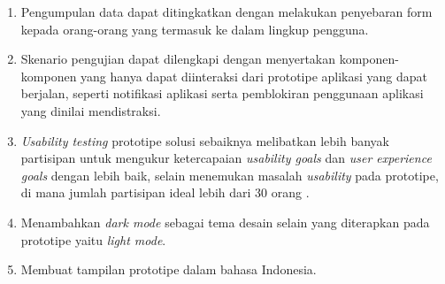 \begin{enumerate}
  \item Pengumpulan data dapat ditingkatkan dengan melakukan penyebaran form kepada orang-orang yang termasuk ke dalam lingkup pengguna.
  
  
  \item Skenario pengujian dapat dilengkapi dengan menyertakan komponen-komponen yang hanya dapat diinteraksi dari prototipe aplikasi yang dapat berjalan, seperti notifikasi aplikasi serta pemblokiran penggunaan aplikasi yang dinilai mendistraksi.
  
  \item \textit{Usability testing} prototipe solusi sebaiknya melibatkan lebih banyak partisipan untuk mengukur ketercapaian \textit{usability goals} dan \textit{user experience goals} dengan lebih baik, selain menemukan masalah \textit{usability} pada prototipe, di mana jumlah partisipan ideal lebih dari 30 orang \parencite{nielsenminimaltest}. 
  
  \item Menambahkan \textit{dark mode} sebagai tema desain selain yang diterapkan pada prototipe yaitu \textit{light mode}.
  
  \item Membuat tampilan prototipe dalam bahasa Indonesia.
\end{enumerate}
